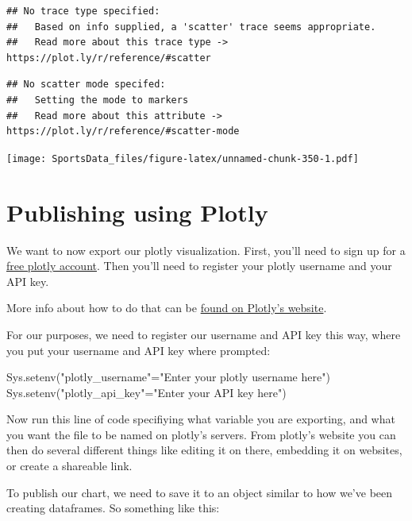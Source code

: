 \documentclass[
]{book}
\newenvironment{Shaded}{\begin{snugshade}}{\end{snugshade}}
\newcommand{\FunctionTok}[1]{\textcolor[rgb]{0.00,0.00,0.00}{#1}}
\newcommand{\NormalTok}[1]{#1}
\newcommand{\OtherTok}[1]{\textcolor[rgb]{0.56,0.35,0.01}{#1}}
\newcommand{\StringTok}[1]{\textcolor[rgb]{0.31,0.60,0.02}{#1}}
\begin{document}
\begin{verbatim}
## No trace type specified:
##   Based on info supplied, a 'scatter' trace seems appropriate.
##   Read more about this trace type -> https://plot.ly/r/reference/#scatter
\end{verbatim}

\begin{verbatim}
## No scatter mode specifed:
##   Setting the mode to markers
##   Read more about this attribute -> https://plot.ly/r/reference/#scatter-mode
\end{verbatim}

\texttt{[image: SportsData\_files/figure-latex/unnamed-chunk-350-1.pdf]}

\hypertarget{publishing-using-plotly}{%
\section{Publishing using Plotly}\label{publishing-using-plotly}}

We want to now export our plotly visualization. First, you'll need to sign up for a \href{https://chart-studio.plotly.com/Auth/login/\#/}{free plotly account}. Then you'll need to register your plotly username and your API key.

More info about how to do that can be \href{https://plot.ly/r/getting-started/\#initialization-for-online-plotting}{found on Plotly's website}.

For our purposes, we need to register our username and API key this way, where you put your username and API key where prompted:

\begin{Shaded}
\begin{Highlighting}[]
\FunctionTok{Sys.setenv}\NormalTok{(}\StringTok{"plotly\_username"}\OtherTok{=}\StringTok{"Enter your plotly username here"}\NormalTok{)}
\FunctionTok{Sys.setenv}\NormalTok{(}\StringTok{"plotly\_api\_key"}\OtherTok{=}\StringTok{"Enter your API key here"}\NormalTok{)}
\end{Highlighting}
\end{Shaded}

Now run this line of code specifiying what variable you are exporting, and what you want the file to be named on plotly's servers. From plotly's website you can then do several different things like editing it on there, embedding it on websites, or create a shareable link.

To publish our chart, we need to save it to an object similar to how we've been creating dataframes. So something like this:
\end{document}
